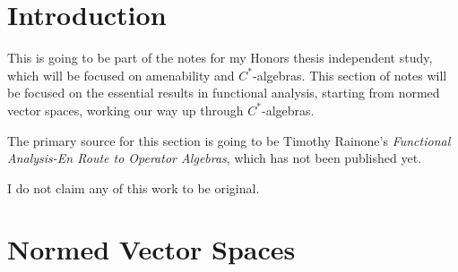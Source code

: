 \documentclass[10pt]{mypackage}
\begin{document}
\RaggedRight
\tableofcontents
\section{Introduction}%
This is going to be part of the notes for my Honors thesis independent study, which will be focused on amenability and $C^{\ast}$-algebras. This section of notes will be focused on the essential results in functional analysis, starting from normed vector spaces, working our way up through $C^{\ast}$-algebras.\newline

The primary source for this section is going to be Timothy Rainone's \textit{Functional Analysis-En Route to Operator Algebras}, which has not been published yet.\newline

I do not claim any of this work to be original.
\section{Normed Vector Spaces}%
\end{document}
